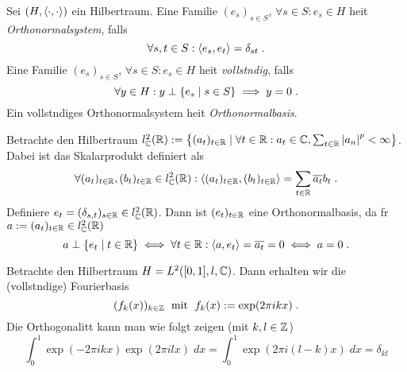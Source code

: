 \begin{definition}
	Sei \((H, \left\langle\cdot, \cdot\right\rangle)\) ein Hilbertraum. Eine Familie \((e_s)_{s\in S}\), \(\forall s \in S: e_s \in H\) hei\s t \textit{Orthonormalsystem}, falls
	\[\forall s, t \in S: \left\langle e_s, e_t\right\rangle = \delta_{st}\;.\]
	Eine Familie \((e_s)_{s\in S}\), \(\forall s \in S: e_s \in H\) hei\s t \textit{vollst\as ndig}, falls 
	\[\forall y \in H: y \perp \left\{e_s \;\vert\; s \in S\right\} \implies y = 0\;.\]
	Ein vollst\as ndiges Orthonormalsystem hei\s t \textit{Orthonormalbasis}.
\end{definition}

\begin{ex}
	Betrachte den Hilbertraum \(l^2_{\mathbb{C}}(\mathbb{R}): = \left\{(a_t)_{t\in\mathbb{R}} \;\vert\; \forall t\in \mathbb{R}: a_t \in \mathbb{C}, \sum_{t\in \mathbb{R}} \left\lvert a_n \right\rvert^p < \infty\right\}\). Dabei ist das Skalarprodukt definiert als
	\[\forall (a_t)_{t\in\mathbb{R}}, (b_t)_{t\in\mathbb{R}} \in l^2_{\mathbb{C}}(\mathbb{R}): \left\langle(a_t)_{t\in\mathbb{R}},(b_t)_{t\in\mathbb{R}}\right\rangle = \sum_{t\in\mathbb{R}} \overline{a_t} b_t\;.\]
	Definiere \(e_t = (\delta_{s,t})_{s\in\mathbb{R}}\in l^2_{\mathbb{C}}(\mathbb{R})\). Dann ist \((e_t)_{t\in\mathbb{R}}\) eine Orthonormalbasis, da f\us r \(a:=(a_t)_{t\in\mathbb{R}} \in l^2_{\mathbb{C}}(\mathbb{R})\)
	\[a \perp \left\{e_t\;\vert\;t\in\mathbb{R}\right\} \iff \forall t \in \mathbb{R}: \left\langle a,e_t\right\rangle = \overline{a_t} = 0 \iff a = 0\;.\]
\end{ex}

\begin{ex}
	Betrachte den Hilbertraum \(H = L^2([0,1], l, \mathbb{C})\). Dann erhalten wir die (vollst\as ndige) Fourierbasis
	\[(f_k(x))_{k\in\mathbb{Z}} \;\text{ mit }\; f_k(x) := \exp(2\pi i kx) \;.\]
	Die Orthogonalit\as t kann man wie folgt zeigen (mit \(k, l \in \mathbb{Z}\))
	\[\int_0^1 \exp(-2\pi i  k x)\exp(2\pi i l x)\;dx = \int_0^1 \exp(2\pi i (l-k)x) \;dx = \delta_{kl}\]
\end{ex}

\begin{theorem}
\end{theorem}

\begin{theorem}
\end{theorem}

\begin{theorem}
\end{theorem}


